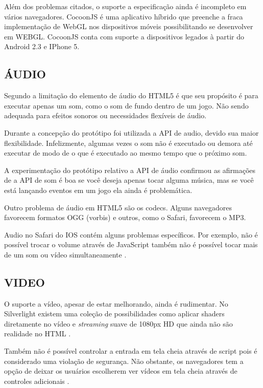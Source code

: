 Além dos problemas citados, o suporte a especificação ainda é
incompleto em vários navegadores. CocoonJS é uma aplicativo híbrido
que preenche a fraca implementação de WebGL nos dispositivos móveis
possibilitando se desenvolver em WEBGL. CocoonJS conta com suporte a
dispositivos legados à partir do Android 2.3 e IPhone 5.

\subsection{ÁUDIO}

Segundo \cite{html5mostwanted} a limitação do elemento de áudio do
HTML5 é que seu propósito é para executar apenas um som, como o som
de fundo dentro de um jogo. Não sendo adequada para efeitos sonoros 
ou necessidades flexíveis de áudio.

Durante a concepção do protótipo foi utilizada a API de audio, devido
sua maior flexibilidade. Infelizmente, algumas vezes o som não é
executado ou demora até executar de modo de o que é executado ao mesmo
tempo que o próximo som.

A experimentação do protótipo relativo a API de áudio confirmou as
afirmações de \cite{html5mostwanted} a API de som é boa se você
deseja apenas tocar alguma música, mas se você está lançando eventos
em um jogo ela ainda é problemática.

Outro problema de áudio em HTML5 são os codecs. Alguns navegadores
favorecem formatos OGG (vorbis) e outros, como o Safari, favorecem o
MP3.

Audio no Safari do IOS contém alguns problemas específicos.
Por exemplo, não é possível trocar o volume através de
JavaScript também não é possível tocar mais de um som ou vídeo
simultaneamente \autocite{unsolvedMediaHtmlIssues}.

\subsection{VIDEO}

O suporte a vídeo, apesar de estar melhorando, ainda é rudimentar. No
Silverlight existem uma coleção de possibilidades como aplicar shaders
diretamente no vídeo e \textit{streaming} suave de 1080px HD que ainda
não são realidade no HTML \autocite[pp. 8]{researchOnHtml}.

Também não é possível controlar a entrada em tela cheia através de script
pois é considerado uma violação de segurança. Não obstante,
os navegadores tem a opção de deixar os usuários escolherem ver
vídeos em tela cheia através de controles adicionais \autocite[pp.
68]{proHtml5}.

